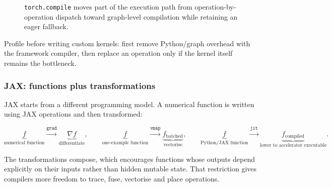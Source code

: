 \begin{figure}[ht]
\centering
{}
\caption{\texttt{torch.compile} moves part of the execution path from operation-by-operation dispatch toward graph-level compilation while retaining an eager fallback.}
\label{fig:torch-compile}
\end{figure}

\begin{calloutpracticaltip}
Profile before writing custom kernels: first remove Python/graph overhead with the framework compiler, then replace an operation only if the kernel itself remains the bottleneck.
\end{calloutpracticaltip}

\subsubsection*{JAX: functions plus transformations}

JAX starts from a different programming model.
A numerical function is written using JAX operations and then transformed:

\[
\underbrace{f}_{\text{numerical function}}
\overset{\texttt{grad}}{\longrightarrow}
\underbrace{\nabla f}_{\text{differentiate}},
\qquad
\underbrace{f}_{\text{one-example function}}
\overset{\texttt{vmap}}{\longrightarrow}
\underbrace{f_{\text{batched}}}_{\text{vectorise}},
\qquad
\underbrace{f}_{\text{Python/JAX function}}
\overset{\texttt{jit}}{\longrightarrow}
\underbrace{f_{\text{compiled}}}_{\text{lower to accelerator executable}}.
\]

The transformations compose, which encourages functions whose outputs depend explicitly on their inputs rather than hidden mutable state.
That restriction gives compilers more freedom to trace, fuse, vectorise and place operations.

